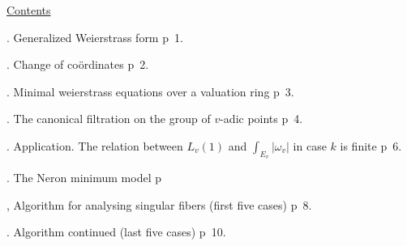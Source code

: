 \begin{center}\uline{Contents}\end{center}

. Generalized Weierstrass form \qquad p~1.

. Change of coördinates \qquad p~2.

. Minimal weierstrass equations over a valuation ring \qquad p~3.

. The canonical filtration on the group of $v$-adic points \qquad p~4.

. Application. The relation between $L_v(1)$ and $\int_{E_v}|\omega_v|$ in case $k$ is finite \qquad p~6.

. The Neron minimum model \qquad p~

, Algorithm for analysing singular fibers \quad (first five cases) \qquad p~8.

. Algorithm continued \quad (last five cases) \qquad p~10.

